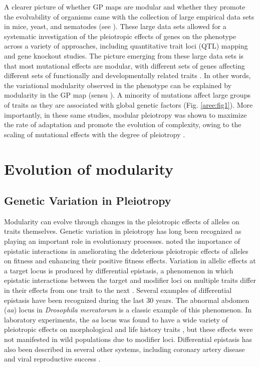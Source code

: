 \begin{refsection}
A clearer picture of whether GP maps are modular and whether they
promote the evolvability of organisms came with the collection of large
empirical data sets in mice, yeast, and nematodes (see
\textcite{Wang2010-da}). These large data
sets allowed for a systematic investigation of the pleiotropic effects
of genes on the phenotype across a variety of approaches, including
quantitative trait loci (QTL) mapping and gene knockout studies. The
picture emerging from these large data sets is that most mutational
effects are modular, with different sets of genes affecting different
sets of functionally and developmentally related traits
\parencite{Wang2010-da}. In other words,
the variational modularity observed in the phenotype can be explained by
modularity in the GP map (sensu \textcite{Wagner1996-ui}). A minority of mutations affect large groups of
traits as they are associated with global genetic factors
(Fig. \ref{aree:fig1}). More importantly, in
these same studies, modular pleiotropy was shown to maximize the rate of
adaptation and promote the evolution of complexity, owing to the scaling
of mutational effects with the degree of pleiotropy \parencite{Wang2010-da}.\enlargethispage{\baselineskip}

\section{Evolution of modularity}

\subsection{Genetic Variation in Pleiotropy}

Modularity can evolve through changes in the pleiotropic effects of
alleles on traits themselves. Genetic variation in pleiotropy has long
been recognized as playing an important role in evolutionary processes.
\textcite{Mayr1963-eq} noted the importance of
epistatic interactions in ameliorating the deleterious pleiotropic
effects of alleles on fitness and enhancing their positive fitness
effects. Variation in allelic effects at a target locus is produced by
differential epistasis, a phenomenon in which epistatic interactions
between the target and modifier loci on multiple traits differ in their
effects from one trait to the next \parencite{Cheverud1996-fm, Pavlicev2008-jy, Pavlicev2011-yg}
. Several examples of differential epistasis have been recognized during the last 30 years.
The abnormal abdomen (\emph{aa}) locus in \emph{Drosophila mercatorum}
is a classic example of this phenomenon. In laboratory experiments, the
\emph{aa} locus was found to have a wide variety of pleiotropic effects
on morphological and life history traits \parencite{Templeton1985-ii}
, but these
effects were not manifested in wild populations due to modifier loci.
Differential epistasis has also been described in several other systems,
including coronary artery disease \parencite{Maxwell2013-fe}
 and viral
reproductive success \parencite{Pepin2006-se}.


\end{refsection}
